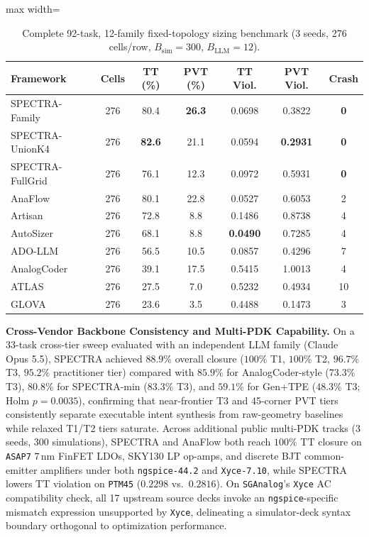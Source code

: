 \begin{table}[ht]
\centering
\caption{Complete 92-task, 12-family fixed-topology sizing benchmark (3 seeds, 276 cells/row, $B_{\text{sim}}=300$, $B_{\text{LLM}}=12$).}
\label{tab:supp_92}
\scriptsize
\setlength{\tabcolsep}{2.2pt}
\begin{adjustbox}{max width=\columnwidth}
\begin{tabular}{@{}lcccccc@{}}
\toprule
Framework & Cells & TT (\%) & PVT (\%) & TT Viol. & PVT Viol. & Crash \\
\midrule
SPECTRA-Family & 276 & 80.4 & \textbf{26.3} & 0.0698 & 0.3822 & \textbf{0} \\
SPECTRA-UnionK4 & 276 & \textbf{82.6} & 21.1 & 0.0594 & \textbf{0.2931} & \textbf{0} \\
SPECTRA-FullGrid & 276 & 76.1 & 12.3 & 0.0972 & 0.5931 & \textbf{0} \\
\midrule
AnaFlow~\cite{ahmadzadeh2025anaflow} & 276 & 80.1 & 22.8 & 0.0527 & 0.6053 & 2 \\
Artisan~\cite{chen2024artisan} & 276 & 72.8 & 8.8 & 0.1486 & 0.8738 & 4 \\
AutoSizer~\cite{yu2026autosizer} & 276 & 68.1 & 8.8 & \textbf{0.0490} & 0.7285 & 4 \\
ADO-LLM~\cite{yin2024adollm} & 276 & 56.5 & 10.5 & 0.0857 & 0.4296 & 7 \\
AnalogCoder~\cite{lai2025analogcoder} & 276 & 39.1 & 17.5 & 0.5415 & 1.0013 & 4 \\
ATLAS~\cite{oh2026atlas} & 276 & 27.5 & 7.0 & 0.5232 & 0.4934 & 10 \\
GLOVA~\cite{kim2025glova} & 276 & 23.6 & 3.5 & 0.4488 & 0.1473 & 3 \\
\bottomrule
\end{tabular}
\end{adjustbox}
\end{table}

\textbf{Cross-Vendor Backbone Consistency and Multi-PDK Capability.} On a 33-task cross-tier sweep evaluated with an independent LLM family (Claude Opus 5.5), \textsc{SPECTRA} achieved $88.9\%$ overall closure ($100\%$ T1, $100\%$ T2, $96.7\%$ T3, $95.2\%$ practitioner tier) compared with $85.9\%$ for AnalogCoder-style ($73.3\%$ T3), $80.8\%$ for SPECTRA-min ($83.3\%$ T3), and $59.1\%$ for Gen+TPE ($48.3\%$ T3; Holm $p=0.0035$), confirming that near-frontier T3 and 45-corner PVT tiers consistently separate executable intent synthesis from raw-geometry baselines while relaxed T1/T2 tiers saturate. Across additional public multi-PDK tracks (3 seeds, 300 simulations), \textsc{SPECTRA} and AnaFlow both reach $100\%$ TT closure on \texttt{ASAP7} $7\,\mathrm{nm}$ FinFET LDOs, SKY130 LP op-amps, and discrete BJT common-emitter amplifiers under both \texttt{ngspice-44.2} and \texttt{Xyce-7.10}, while \textsc{SPECTRA} lowers TT violation on \texttt{PTM45} ($0.2298$ vs.\ $0.2816$). On \texttt{SGAnalog}'s \texttt{Xyce} AC compatibility check, all 17 upstream source decks invoke an \texttt{ngspice}-specific mismatch expression unsupported by \texttt{Xyce}, delineating a simulator-deck syntax boundary orthogonal to optimization performance.
